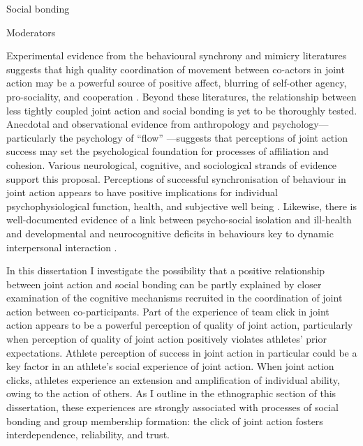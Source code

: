 \begin{CJK}{UTF8}{gbsn}
       Social bonding

       Moderators





Experimental evidence from the behavioural synchrony and mimicry literatures suggests that high quality coordination of movement between co-actors in joint action may be a powerful source of positive affect, blurring of self-other agency, pro-sociality, and cooperation \citep{Mogan2017}. Beyond these literatures, the relationship between less tightly coupled joint action and social bonding is yet to be thoroughly tested.  Anecdotal and observational evidence from anthropology and psychology---particularly the psychology of ``flow'' \citep{Csikszentmihalyi1992,Jackson1999}---suggests that perceptions of joint action success may set the psychological foundation for processes of affiliation and cohesion.  Various neurological, cognitive, and sociological strands of evidence support this proposal.  Perceptions of successful synchronisation of behaviour in joint action appears to have positive implications for individual psychophysiological function, health, and subjective well being \citep{Wheatley2012}.  Likewise, there is well-documented evidence of a link between psycho-social isolation and ill-health and developmental and neurocognitive deficits in behaviours key to dynamic interpersonal interaction \citep[e.g.][]{Blakemore2005,Baron-Cohen1991}.

In this dissertation I investigate the possibility that a positive relationship between joint action and social bonding can be partly explained by closer examination of the cognitive mechanisms recruited in the coordination of joint action between co-participants.  Part of the experience of team click in joint action appears to be a powerful perception of quality of joint action, particularly when perception of quality of joint action positively violates athletes' prior expectations.  Athlete perception of success in joint action in particular could be a key factor in an athlete's social experience of joint action.  When joint action clicks, athletes experience an extension and amplification of individual ability, owing to the action of others.  As I outline in the ethnographic section of this dissertation, these experiences are strongly associated with processes of social bonding and group membership formation: the click of joint action fosters interdependence, reliability, and trust.


\end{CJK}

